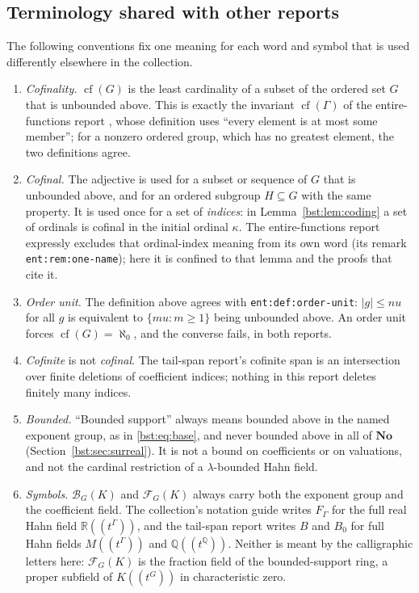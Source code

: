 \documentclass[11pt,letterpaper]{article}
\theoremstyle{definition}
\theoremstyle{remark}
\newcommand{\Q}{\mathbb Q}
\newcommand{\R}{\mathbb R}
\newcommand{\No}{\mathbf{No}}
\newcommand{\cof}{\operatorname{cf}}
\newcommand{\HH}[2]{#1((t^{#2}))}
\newcommand{\BB}[2]{\mathcal B_{#2}(#1)}
\newcommand{\FF}[2]{\mathcal F_{#2}(#1)}
\newcommand{\abs}[1]{\lvert #1\rvert}
\begin{document}
\subsection{Terminology shared with other reports}\label{bst:subsec:terms}

The following conventions fix one meaning for each word and symbol that is
used differently elsewhere in the collection.
\begin{enumerate}
\item \emph{Cofinality.} $\cof(G)$ is the least cardinality of a subset of
the ordered set $G$ that is unbounded above. This is exactly the invariant
$\cof(\Gamma)$ of the entire-functions report \cite{RepoEntire}, whose
definition uses ``every element is at most some member''; for a nonzero
ordered group, which has no greatest element, the two definitions agree.
\item \emph{Cofinal.} The adjective is used for a subset or sequence of $G$
that is unbounded above, and for an ordered subgroup $H\subseteq G$ with the
same property. It is used once for a set of \emph{indices}: in
Lemma~\ref{bst:lem:coding} a set of ordinals is cofinal in the initial
ordinal $\kappa$. The entire-functions report expressly excludes that
ordinal-index meaning from its own word (its remark \texttt{ent:rem:one-name});
here it is confined to that lemma and the proofs that cite it.
\item \emph{Order unit.} The definition above agrees with
\texttt{ent:def:order-unit}: $\abs g\le nu$ for all $g$ is equivalent to
$\{mu:m\ge1\}$ being unbounded above. An order unit forces $\cof(G)=\aleph_0$,
and the converse fails, in both reports.
\item \emph{Cofinite} is not \emph{cofinal}. The tail-span report's
cofinite span is an intersection over finite deletions of coefficient
indices; nothing in this report deletes finitely many indices.
\item \emph{Bounded.} ``Bounded support'' always means bounded above in the
named exponent group, as in \eqref{bst:eq:base}, and never bounded above in
all of $\No$ (Section~\ref{bst:sec:surreal}). It is not a bound on
coefficients or on valuations, and not the cardinal restriction of a
$\lambda$-bounded Hahn field.
\item \emph{Symbols.} $\BB KG$ and $\FF KG$ always carry both the exponent
group and the coefficient field. The collection's notation guide
\cite{RepoNotation} writes $F_\Gamma$ for the full real Hahn field
$\R((t^\Gamma))$, and the tail-span report writes $B$ and $B_0$ for full
Hahn fields $M((t^\Gamma))$ and $\Q((t^\Q))$. Neither is meant by the
calligraphic letters here: $\FF KG$ is the fraction field of the
bounded-support ring, a proper subfield of $\HH KG$ in characteristic zero.
\end{enumerate}
\end{document}
